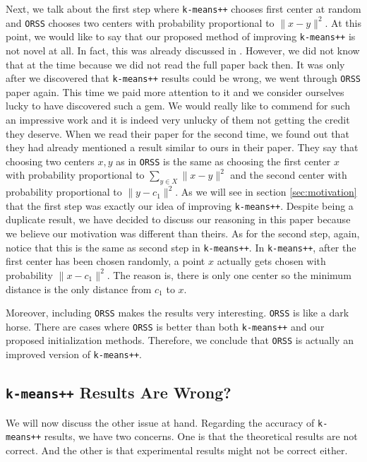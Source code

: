 \documentclass[twoside, 11pt]{article}
\begin{document}
	Next, we talk about the first step where \texttt{k-means++} chooses first center at random and \texttt{ORSS} chooses two centers with probability proportional to $\|x-y\|^2$. At this point, we would like to say that our proposed method of improving \texttt{k-means++} is not novel at all. In fact, this was already discussed in \citep{ostrovsky}. However, we did not know that at the time because we did not read the full paper back then. It was only after we discovered that \texttt{k-means++} results could be wrong, we went through \texttt{ORSS} paper again. This time we paid more attention to it and we consider ourselves lucky to have discovered such a gem. We would really like to commend \cite{ostrovsky} for such an impressive work and it is indeed very unlucky of them not getting the credit they deserve. When we read their paper for the second time, we found out that they had already mentioned a result \cite[Page 4, section 3, Paragraph: Running Time]{ostrovsky} similar to ours in their paper. They say that choosing two centers $x,y$ as in \texttt{ORSS} is the same as choosing the first center $x$ with probability proportional to $\sum_{y\in X}\|x-y\|^2$ and the second center with probability proportional to $\|y-c_1\|^2$. As we will see in section \ref{sec:motivation} that the first step was exactly our idea of improving \texttt{k-means++}. Despite being a duplicate result, we have decided to discuss our reasoning in this paper because we believe our motivation was different than theirs. As for the second step, again, notice that this is the same as second step in \texttt{k-means++}. In \texttt{k-means++}, after the first center has been chosen randomly, a point $x$ actually gets chosen with probability $\|x-c_1\|^2$. The reason is, there is only one center so the minimum distance is the only distance from $c_1$ to $x$. 
	
	Moreover, including \texttt{ORSS} makes the results very interesting. \texttt{ORSS} is like a dark horse. There are cases where \texttt{ORSS} is better than both \texttt{k-means++} and our proposed initialization methods. Therefore, we conclude that \texttt{ORSS} is actually an improved version of \texttt{k-means++}.
	\subsection{\texttt{k-means++} Results Are Wrong?}
	We will now discuss the other issue at hand. Regarding the accuracy of \texttt{k-means++} results, we have two concerns. One is that the theoretical results are not correct. And the other is that experimental results might not be correct either.
	
\end{document}
